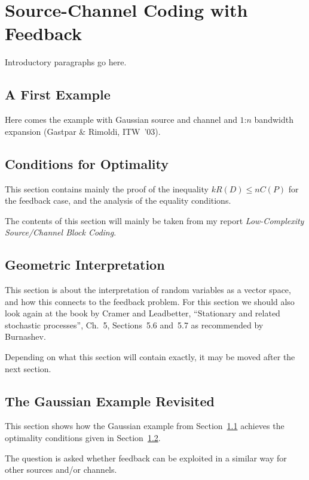 \chapter{Source-Channel Coding with Feedback}

Introductory paragraphs go here.


\section{A First Example}
\label{sec:gaussex}

Here comes the example with Gaussian source and channel and $1$:$n$ bandwidth
expansion (Gastpar \& Rimoldi, ITW~'03).


\section{Conditions for Optimality}
\label{sec:fboptimality}

This section contains mainly the proof of the inequality $kR(D) \le nC(P)$ for
the feedback case, and the analysis of the equality conditions. 

The contents of this section will mainly be taken from my report
\emph{Low-Complexity Source/Channel Block Coding}.


\section{Geometric Interpretation}

This section is about the interpretation of random variables as a vector space,
and how this connects to the feedback problem. For this section we should also
look again at the book by Cramer and Leadbetter, ``Stationary and related
stochastic processes'', Ch.~5, Sections~5.6 and~5.7 as recommended by Burnashev.

Depending on what this section will contain exactly, it may be moved after the
next section.


\section{The Gaussian Example Revisited}
\label{sec:gaussexrev}

This section shows how the Gaussian example from Section~\ref{sec:gaussex}
achieves the optimality conditions given in Section~\ref{sec:fboptimality}.

The question is asked whether feedback can be exploited in a similar way for
other sources and/or channels.


